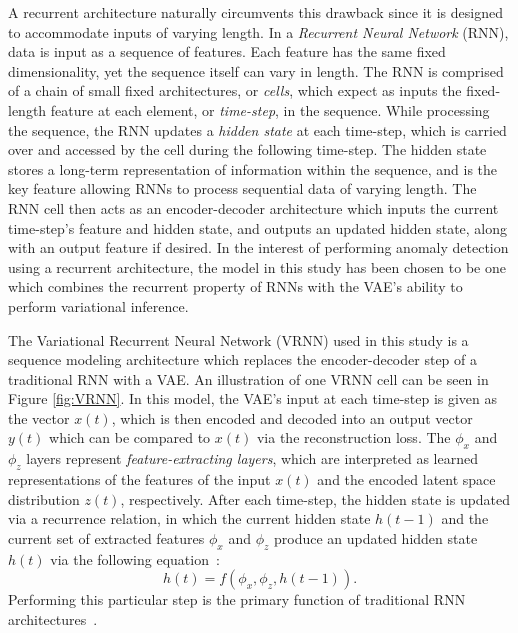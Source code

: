 \documentclass[11pt, a4paper]{article}
\begin{document}
A recurrent architecture naturally circumvents this drawback since it is designed to accommodate inputs of varying length. 
In a \textit{Recurrent Neural Network} (RNN), data is input as a sequence of features. Each feature has the same fixed dimensionality, yet the sequence itself can vary in length. 
The RNN is comprised of a chain of small fixed architectures, or \textit{cells}, which expect as inputs the fixed-length feature at each element, or \textit{time-step}, in the sequence. 
While processing the sequence, the RNN updates a \textit{hidden state} at each time-step, which is carried over and accessed by the cell during the following time-step. 
The hidden state stores a long-term representation of information within the sequence, and is the key feature allowing RNNs to process sequential data of varying length. 
The RNN cell then acts as an encoder-decoder architecture which inputs the current time-step's feature and hidden state, and outputs an updated hidden state, along with an output feature if desired. 
In the interest of performing anomaly detection using a recurrent architecture, the model in this study has been chosen to be one which combines the recurrent property of RNNs with the VAE's ability to perform variational inference. 

The Variational Recurrent Neural Network (VRNN) used in this study is a sequence modeling architecture
which replaces the encoder-decoder step of a traditional RNN with a VAE. 
An illustration of one VRNN cell can be seen
in Figure \ref{fig:VRNN}. 
In this model, the VAE's input at each time-step is given as the vector $x(t)$, which is then encoded and decoded into an output vector $y(t)$ which can be compared to $x(t)$ via the reconstruction loss.
The $\phi_{x}$ and $\phi_{z}$ layers represent \textit{feature-extracting layers}, which are interpreted as learned representations of the features of the input $x(t)$ and the encoded latent space distribution $z(t)$, respectively. 
After each time-step, the hidden state is updated via a recurrence relation, in which the current hidden state $h(t-1)$ and the current set of extracted features $\phi_{x}$ and $\phi_{z}$ produce an updated hidden state $h(t)$ via the following equation~\cite{chung2016recurrent}:
\begin{equation}
	h(t) = f(\phi_{x}, \phi_{z}, h(t-1)).
\end{equation} 
Performing this particular step is the primary function of traditional RNN architectures~\cite{lstm, cho2014learning}.
\end{document}
